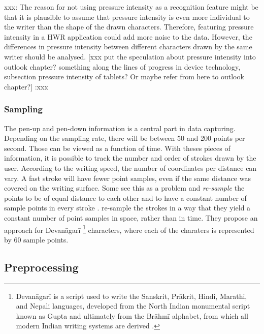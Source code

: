 xxx: 
The reason for not using pressure intensity as a recognition feature might be 
that it is plausible to assume that pressure intensity is even more individual 
to the writer than the shape of the drawn characters. 
Therefore, featuring pressure intensity in a HWR application could add more 
noise to the data. However, the differences in pressure intensity 
between different characters drawn by the same writer should be analysed.
[xxx put the speculation about pressure intensity into outlook chapter? 
something along the lines of progress in device technology, 
subsection pressure intensity of tablets? Or maybe refer from here to
outlook chapter?] 
:xxx

\subsubsection{Sampling}
\label{sec:sampling}

The pen-up and pen-down information is a central part in data capturing. 
Depending on the sampling rate, there will be between 50 and 200 points per 
second. Those can be viewed as a function of time.
With theses pieces of information, it is possible to track the number and order
of strokes drawn by the user. According to the writing speed, the number of 
coordinates per distance can vary. A fast stroke will have fewer point samples,
even if the same distance was covered on the writing surface.
Some see this as a problem and \emph{re-sample} the points to be of equal 
distance to each other and to have a constant number of sample points in every 
stroke .
 re-sample the strokes in a way that they yield a constant 
number of point samples in space, rather than in time. They propose an approach 
for Devanāgarī
\footnote 
{
Devanāgarī is a script used to write the Sanskrit, Prākrit, Hindi, Marathi, 
and Nepali languages, developed from the North Indian monumental script known 
as Gupta and ultimately from the Brāhmī alphabet, from which all modern Indian 
writing systems are derived \cite{EncyclopediaBritannicaDevanagari}.
} 
characters, where each of the charaters is represented by 60 sample points.

\subsection{Preprocessing}
\label{sec:preprocessing}


